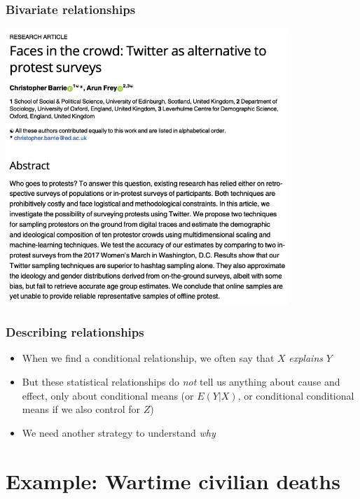 \documentclass[aspectratio=43]{beamer}
\begin{document}
\begin{frame}
\frametitle{Bivariate relationships}
\centering

\includegraphics[width = 0.8\textwidth]{../img/twitter_protests}

\end{frame}

\begin{frame}
\frametitle{Describing relationships}
\centering

\begin{itemize}
  \item When we find a conditional relationship, we often say that $X$ \textit{explains} $Y$
  \item But these statistical relationships do \textit{not} tell us anything about cause and effect, only about conditional means (or $E(Y|X)$, or conditional conditional means if we also control for $Z$)
  \item We need another strategy to understand \textit{why}
\end{itemize}

\end{frame}

\section{Example: Wartime civilian deaths}
\end{document}
